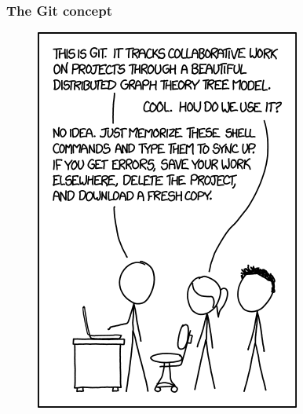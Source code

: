 \documentclass[11pt]{beamer}
\begin{document}
\begin{frame}[fragile]
\frametitle{The Git concept}

\begin{figure}[htp]
 \includegraphics[scale=0.35]{what-is-git.png}
 
\end{figure}


\end{frame}


\end{document}
